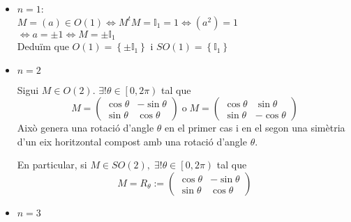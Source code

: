 \documentclass[../main.tex]{subfiles}
\begin{document}
\begin{itemize}
    \item $n = 1$:\\
    $M = (a) \in O(1) \iff M^tM = \mathbb{I}_1 = 1 \iff (a^2) = 1$\\$\iff a = \pm 1 \iff M = \pm \mathbb{I}_1$\\
    Deduïm que $O(1) = \left\{\pm \mathbb{I}_1\right\}$ i $SO(1) = \left\{\mathbb{I}_1\right\}$
    \item $n = 2$
    \begin{proposicio}
        Sigui $M \in O(2)$. $\exists! \theta \in \left[0, 2\pi\right)$ tal que\\
        \begin{displaymath}
            M = \begin{pmatrix}
                \cos{\theta} & -\sin{\theta}\\
                \sin{\theta} & \cos{\theta}
            \end{pmatrix}\;\text{o}\; M = \begin{pmatrix}
                \cos{\theta} & \sin{\theta}\\
                \sin{\theta} & -\cos{\theta}
            \end{pmatrix}
        \end{displaymath}
        Això genera una rotació d'angle $\theta$ en el primer cas i en el segon una simètria d'un
        eix horitzontal compost amb una rotació d'angle $\theta$.
    \end{proposicio}
    \begin{obs}
        En particular, si $M \in SO(2),\; \exists! \theta \in \left[0, 2\pi\right)$ tal que
        \begin{displaymath}
            M = R_\theta := \begin{pmatrix}
                \cos{\theta} & -\sin{\theta}\\
                \sin{\theta} & \cos{\theta}
            \end{pmatrix}
        \end{displaymath}
    \end{obs}
    \item $n = 3$
\end{itemize}
\end{document}

